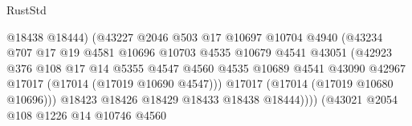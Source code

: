 \begin{lexlean}{RustStd}
\begin{coremodule}
{\begin{coremodule}
{{{{{{{{{{{{{{{{{{{{{{{{{{{{{{{{{{{{{{{{{{{{{{{{{{{{{{{                                            @18438
                                            @18444)
                                          (@43227
                                            @2046
                                            @503
                                            @17
                                            @10697
                                            @10704
                                            @4940
                                            (@43234
                                              @707
                                              @17
                                              @19
                                              @4581
                                              @10696
                                              @10703
                                              @4535
                                              @10679
                                              @4541
                                              @43051
                                              (@42923
                                                @376
                                                @108
                                                @17
                                                @14
                                                @5355
                                                @4547
                                                @4560
                                                @4535
                                                @10689
                                                @4541
                                                @43090
                                                @42967
                                                @17017
                                                (@17014 (@17019 @10690 @4547)))
                                              @17017
                                              (@17014 (@17019 @10680 @10696)))
                                            @18423
                                            @18426
                                            @18429
                                            @18433
                                            @18438
                                            @18444))))
                                    (@43021
                                      @2054
                                      @108
                                      @1226
                                      @14
                                      @10746
                                      @4560
}}}}}}}}}}}}}}}}}}}}}}}}}}}}}}}}}}}}}}}}}}}}}}}}}}}}}}}
\end{coremodule}}
\end{coremodule}
\end{lexlean}
